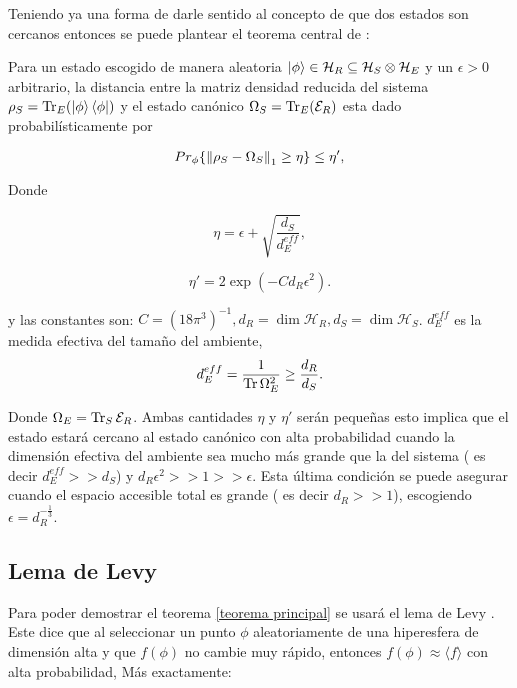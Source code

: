 Teniendo ya una forma de darle sentido al concepto de que dos estados son cercanos entonces se puede plantear el teorema central de \cite{Popescu2006}:
\\
\begin{theorem} \label{teorema principal}
Para un estado escogido de manera aleatoria $\ket{\phi} \in \mathcal{H}_{R} \subseteq \mathcal{H}_{S} \otimes \mathcal{H}_{E} $ y un $\epsilon > 0$ arbitrario, la distancia entre la matriz densidad reducida del sistema $\rho_{S}=\Tr_{E}(\ket{\phi} \bra{\phi})$  y el estado canónico $\Omega_{S}=\Tr_{E} ( \mathcal{E}_{R})$ esta dado probabilísticamente por 

\begin{equation}
Pr_{\phi} \{  \norm{\rho_{S} -\Omega_{S}}_{1} \geq \eta \} \leq \eta',
\end{equation}

Donde 

\begin{equation}
\eta= \epsilon + \sqrt{ \frac{d_{S}}{d_{E}^{eff}} },
\end{equation}

\begin{equation}
\eta'=2\exp (-C d_{R} \epsilon^{2} ).
\end{equation}


y las constantes son: $ C=(18 \pi^{3})^{-1}, d_{R} = \dim \mathcal{H}_{R}, d_{S} = \dim \mathcal{H}_{S} $. $d_{E}^{eff}$ es la medida efectiva del tamaño del ambiente,
\begin{equation}
d_{E}^{eff}= \frac{1}{\Tr \Omega_{E}^{2}} \ge \frac{d_{R}}{d_{S}}.
\end{equation}

Donde $\Omega_{E}= \Tr_{S} \mathcal{E}_{R}$. Ambas cantidades $\eta $ y $\eta'$ serán pequeñas esto implica que el estado estará cercano al estado canónico con alta probabilidad cuando la dimensión efectiva del ambiente sea mucho más grande que la del sistema ( es decir $d_{E}^{eff} >> d_{S}$) y  $d_{R}\epsilon^2>>1>>\epsilon$. Esta última condición se puede asegurar cuando el espacio accesible total es grande ( es decir $d_{R}>>1$), escogiendo $\epsilon=d_{R}^{-\frac{1}{3}}$.\\
\end{theorem}

\subsection{Lema de Levy} \label{ levy}
Para poder demostrar el teorema \ref{teorema principal} se usará  el lema de Levy \cite{Lema}. Este dice que al seleccionar un punto $\phi$ aleatoriamente de una hiperesfera de dimensión alta y que $f(\phi)$ no cambie muy rápido, entonces $f(\phi) \approx \langle f \rangle $ con alta probabilidad, Más exactamente:\\

